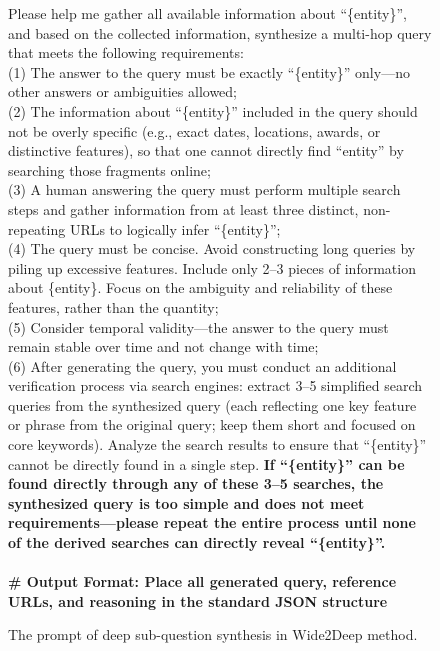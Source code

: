 \documentclass[11pt, letterpaper, logo, onecolumn, copyright, numbering]{paper_improved}
\begin{document}
\begin{figure}[htbp]
\small
\centering
\begin{tcolorbox}
Please help me gather all available information about ``\{entity\}'', and based on the collected information, synthesize a multi-hop query that meets the following requirements:
\\
(1) The answer to the query must be exactly ``\{entity\}'' only—no other answers or ambiguities allowed;  \\
(2) The information about ``\{entity\}'' included in the query should not be overly specific (e.g., exact dates, locations, awards, or distinctive features), so that one cannot directly find ``{entity}'' by searching those fragments online; \\ 
(3) A human answering the query must perform multiple search steps and gather information from at least three distinct, non-repeating URLs to logically infer ``\{entity\}'';\\
(4) The query must be concise. Avoid constructing long queries by piling up excessive features. Include only 2–3 pieces of information about \{entity\}. Focus on the ambiguity and reliability of these features, rather than the quantity; \\
(5) Consider temporal validity—the answer to the query must remain stable over time and not change with time; \\
(6) After generating the query, you must conduct an additional verification process via search engines: extract 3–5 simplified search queries from the synthesized query (each reflecting one key feature or phrase from the original query; keep them short and focused on core keywords). Analyze the search results to ensure that ``\{entity\}'' cannot be directly found in a single step. \textbf{If ``\{entity\}'' can be found directly through any of these 3–5 searches, the synthesized query is too simple and does not meet requirements—please repeat the entire process until none of the derived searches can directly reveal ``\{entity\}''.}\\
\\
\textbf{\# Output Format: Place all generated query, reference URLs, and reasoning in the standard JSON structure}\\
\end{tcolorbox}
\caption{The prompt of deep sub-question synthesis in Wide2Deep method.}
\label{img:deep_sub_question_systhesis}
\end{figure}
\end{document}
